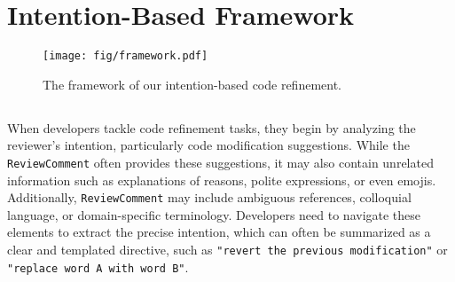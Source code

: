 \section{Intention-Based Framework}



\begin{figure*}[!t]
\centering
\texttt{[image: fig/framework.pdf]}
\vspace{-6mm}
\caption{The framework of our intention-based code refinement.}
\label{fig:framework}
\vspace{-4mm}
\end{figure*}

\subsection{}
When developers tackle code refinement tasks, they begin by analyzing the reviewer's intention, particularly code modification suggestions. While the \texttt{ReviewComment} often provides these suggestions, it may also contain unrelated information such as explanations of reasons, polite expressions, or even emojis. Additionally, \texttt{ReviewComment} may include ambiguous references, colloquial language, or domain-specific terminology. Developers need to navigate these elements to extract the precise intention, which can often be summarized as a clear and templated directive, such as \texttt{"revert the previous modification"} or \texttt{"replace word A with word B"}. 

